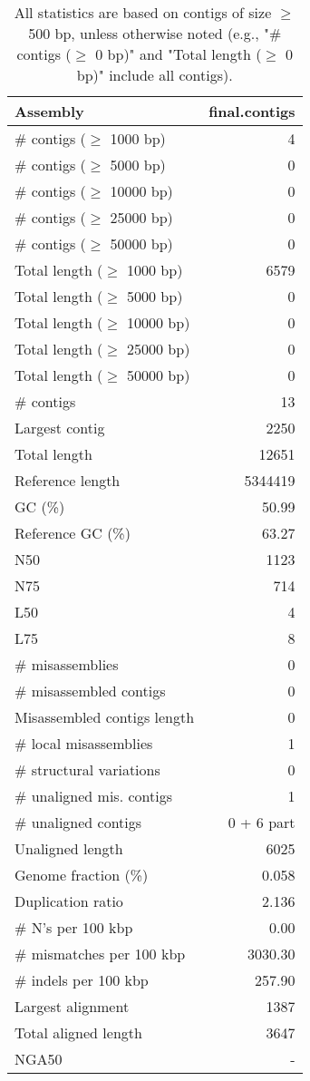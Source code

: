 \documentclass[12pt,a4paper]{article}
\begin{document}
\begin{table}[ht]
\begin{center}
\caption{All statistics are based on contigs of size $\geq$ 500 bp, unless otherwise noted (e.g., "\# contigs ($\geq$ 0 bp)" and "Total length ($\geq$ 0 bp)" include all contigs).}
\begin{tabular}{|l*{1}{|r}|}
\hline
Assembly & final.contigs \\ \hline
\# contigs ($\geq$ 1000 bp) & 4 \\ \hline
\# contigs ($\geq$ 5000 bp) & 0 \\ \hline
\# contigs ($\geq$ 10000 bp) & 0 \\ \hline
\# contigs ($\geq$ 25000 bp) & 0 \\ \hline
\# contigs ($\geq$ 50000 bp) & 0 \\ \hline
Total length ($\geq$ 1000 bp) & 6579 \\ \hline
Total length ($\geq$ 5000 bp) & 0 \\ \hline
Total length ($\geq$ 10000 bp) & 0 \\ \hline
Total length ($\geq$ 25000 bp) & 0 \\ \hline
Total length ($\geq$ 50000 bp) & 0 \\ \hline
\# contigs & 13 \\ \hline
Largest contig & 2250 \\ \hline
Total length & 12651 \\ \hline
Reference length & 5344419 \\ \hline
GC (\%) & 50.99 \\ \hline
Reference GC (\%) & 63.27 \\ \hline
N50 & 1123 \\ \hline
N75 & 714 \\ \hline
L50 & 4 \\ \hline
L75 & 8 \\ \hline
\# misassemblies & 0 \\ \hline
\# misassembled contigs & 0 \\ \hline
Misassembled contigs length & 0 \\ \hline
\# local misassemblies & 1 \\ \hline
\# structural variations & 0 \\ \hline
\# unaligned mis. contigs & 1 \\ \hline
\# unaligned contigs & 0 + 6 part \\ \hline
Unaligned length & 6025 \\ \hline
Genome fraction (\%) & 0.058 \\ \hline
Duplication ratio & 2.136 \\ \hline
\# N's per 100 kbp & 0.00 \\ \hline
\# mismatches per 100 kbp & 3030.30 \\ \hline
\# indels per 100 kbp & 257.90 \\ \hline
Largest alignment & 1387 \\ \hline
Total aligned length & 3647 \\ \hline
NGA50 & - \\ \hline
\end{tabular}
\end{center}
\end{table}
\end{document}
